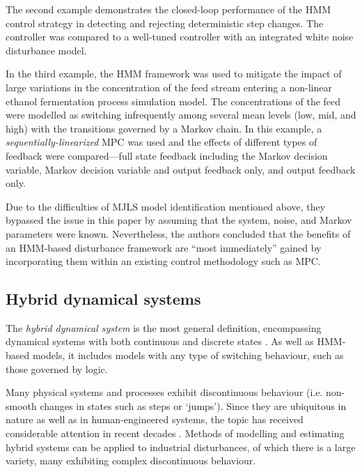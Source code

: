 The second example demonstrates the closed-loop performance of the \gls{HMM} control strategy in detecting and rejecting deterministic step changes. The controller was compared to a well-tuned controller with an integrated white noise disturbance model.

In the third example, the \gls{HMM} framework was used to mitigate the impact of large variations in the concentration of the feed stream entering a non-linear ethanol fermentation process simulation model. The concentrations of the feed were modelled as switching infrequently among several mean levels (low, mid, and high) with the transitions governed by a Markov chain. In this example, a \textit{sequentially-linearized} \gls{MPC} \citep{lee_extended_1994} was used and the effects of different types of feedback were compared---full state feedback including the Markov decision variable, Markov decision variable and output feedback only, and output feedback only.

Due to the difficulties of \gls{MJLS} model identification mentioned above, they bypassed the issue in this paper by assuming that the system, noise, and Markov parameters were known. Nevertheless, the authors concluded that the benefits of an \gls{HMM}-based disturbance framework are ``most immediately'' gained by incorporating them within an existing control methodology such as \gls{MPC}.

\subsection{Hybrid dynamical systems} \label{sec:lit-hybrid}

The \textit{hybrid dynamical system} is the most general definition, encompassing dynamical systems with both continuous and discrete states \citep{van_der_schaft_introduction_2000}. As well as \gls{HMM}-based models, it includes models with any type of switching behaviour, such as those governed by logic.

Many physical systems and processes exhibit discontinuous behaviour (i.e. non-smooth changes in states such as steps or ‘jumps’). Since they are ubiquitous in nature as well as in human-engineered systems, the topic has received considerable attention in recent decades \citep{sworder_boyd_1999, bemporad_identification_2001, costa_discrete-time_2005, camacho_model_2010, djemai_hybrid_2014, estrada_hybrid_2014, guo_moving_2013, botha_hybrid_2018, bemporad_fitting_2018, oliveira_iterative_2020, piga_estimation_2020}. Methods of modelling and estimating hybrid systems can be applied to industrial disturbances, of which there is a large variety, many exhibiting complex discontinuous behaviour.

